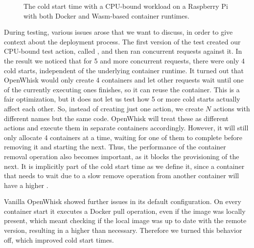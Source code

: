 \begin{figure}
    \begin{center}
        
    \end{center}
    \caption{The cold start time with a CPU-bound workload on a Raspberry Pi with both Docker and Wasm-based container runtimes.}
    \label{fig:pi-cold-start-hash}
\end{figure}

During testing, various issues arose that we want to discuss, in order to give context about the deployment process. 
The first version of the test created our CPU-bound test action, called , and then ran concurrent requests against it. In the result we noticed that for 5 and more concurrent requests, there were only 4 cold starts, independent of the underlying container runtime. It turned out that OpenWhisk would only create 4 containers and let other requests wait until one of the currently executing ones finishes, so it can reuse the container. This is a fair optimization, but it does not let us test how 5 or more cold starts actually affect each other. So, instead of creating just one action, we create $N$ actions with different names but the same code. OpenWhisk will treat these as different actions and execute them in separate containers accordingly. However, it will still only allocate 4 containers at a time, waiting for one of them to complete before removing it and starting the next. Thus, the performance of the container removal operation also becomes important, as it blocks the provisioning of the next. It is implicitly part of the cold start time as we define it, since a container that needs to wait due to a slow remove operation from another container will have a higher .

Vanilla OpenWhisk showed further issues in its default configuration. On every container start it executes a Docker pull operation, even if the image was locally present, which meant checking if the local image was up to date with the remote version, resulting in a higher  than necessary. Therefore we turned this behavior off, which improved cold start times.

